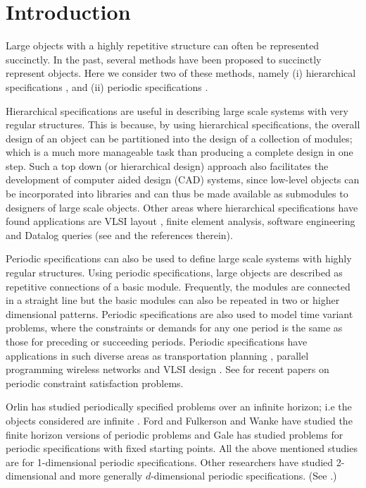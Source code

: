 \section{Introduction}
\label{sec:intro}

Large objects with a highly repetitive structure can often be represented
succinctly.
In the past, several methods have been proposed to succinctly 
represent objects.
Here we consider two of these methods, namely
(i) hierarchical specifications  
\cite{Ga82,GW83,LW92,BOW83,RH93},
and (ii) periodic specifications 
\cite{CM91,HW92,IS87,KO91,KS88,Or82a,Wa93}.
 


Hierarchical specifications are useful in describing large scale systems with
very regular structures. This is because, 
by using hierarchical specifications, the overall design of an object can be 
partitioned into the design of a collection of modules;
which is a 
much more manageable task than producing a complete design in one step.
Such a top down (or hierarchical design) approach 
also facilitates the development of computer aided design (CAD) systems, since
low-level objects can be  incorporated into libraries and can thus be made
available as submodules to designers of large scale  objects.
Other areas where hierarchical specifications have found applications are
VLSI layout \cite{HLW92,HW92,RH93},  
finite element analysis, software engineering and Datalog queries 
(see \cite{HLW92,Ma94,goller2005fixpoint,brenguier2012comparison,lohrey2012model} 
and the references therein). 

Periodic specifications
can also be used to define large scale systems with highly regular structures.
Using  periodic specifications, 
large objects are  described as repetitive connections of a basic module.
Frequently, the modules are connected in a straight line 
but the basic modules can also  be repeated in two or higher
dimensional patterns. Periodic specifications are also used to 
model time variant  problems,  where the constraints
or demands  for any one period is the same as those for preceding or 
succeeding periods. 
 Periodic specifications 
have applications in such diverse areas  as  transportation planning
\cite{Or82a,HLW92,Ma9},
parallel programming \cite{HLW92,KMW67} wireless networks \cite{andreou2002radiocoloring} and 
VLSI design \cite{IS87,IS88}. See \cite{chen2003periodic,chen2005periodic} for recent 
papers on periodic constraint satisfaction problems.

Orlin has studied periodically specified problems over an infinite 
horizon; i.e the objects considered are infinite \cite{Or82a}. 
Ford and Fulkerson \cite{FF58} and Wanke \cite{Wa93} have 
studied the finite horizon
versions of periodic problems and Gale \cite{Ga59} has studied problems for
periodic specifications with fixed starting points. All the above mentioned
studies are for 1-dimensional periodic specifications.
Other 
researchers have studied 2-dimensional and more generally $d$-dimensional
periodic specifications. (See  \cite{CM91,IS87,KO91,KS88,Wa93}.) 

